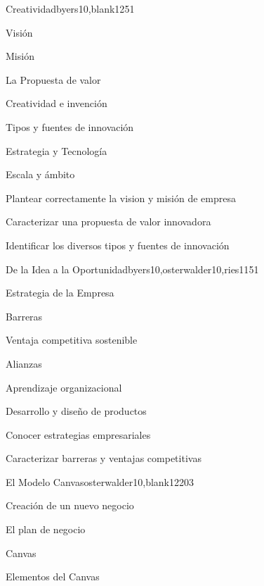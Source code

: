 \begin{syllabus}
\begin{unit}{Creatividad}{byers10,blank12}{5}{1}
\begin{topics}
      \item Visión
      \item Misión
      \item La Propuesta de valor
      \item Creatividad e invención
      \item Tipos y fuentes de innovación
      \item Estrategia y Tecnología
      \item Escala y ámbito
   \end{topics}

   \begin{unitgoals}
      \item Plantear correctamente la vision y misión de empresa
	  \item Caracterizar una propuesta de valor innovadora
      \item Identificar los diversos tipos y fuentes de innovación
   \end{unitgoals}
\end{unit}

\begin{unit}{De la Idea a la Oportunidad}{byers10,osterwalder10,ries11}{5}{1}
\begin{topics}
      \item Estrategia de la Empresa
      \item Barreras 
      \item Ventaja competitiva sostenible
      \item Alianzas
      \item Aprendizaje organizacional
      \item Desarrollo y diseño de productos
   \end{topics}

   \begin{unitgoals}
      \item Conocer estrategias empresariales
      \item Caracterizar barreras y ventajas competitivas 
       
    \end{unitgoals}
\end{unit}

\begin{unit}{El Modelo Canvas}{osterwalder10,blank12}{20}{3}
	\begin{topics}
      \item Creación de un nuevo negocio
      \item El plan de negocio 
      \item Canvas
      \item Elementos del Canvas
   \end{topics}


\end{unit}
\end{syllabus}
